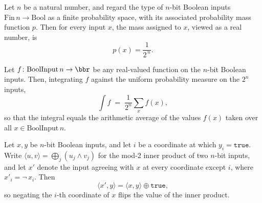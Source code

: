 \begin{lemma}
\label{CommunicationComplexity.Functions.InnerProduct.pmf_toReal_eq_two_pow_inv}
\leanok
{}
Let $n$ be a natural number, and regard the type of $n$-bit Boolean inputs
$\mathrm{Fin}\,n \to \mathrm{Bool}$ as a finite probability space, with its associated
probability mass function $p$. Then for every input $x$, the mass assigned to $x$,
viewed as a real number, is
\[
p(x) = \frac{1}{2^{\,n}}.
\]
\end{lemma}

\begin{lemma}
\label{CommunicationComplexity.Functions.InnerProduct.integral_eq_average_sum}
\leanok
{}
Let $f \colon \mathrm{BoolInput}\,n \to \bbr$ be any real-valued function on the $n$-bit
Boolean inputs. Then, integrating $f$ against the uniform probability measure on the
$2^n$ inputs,
\[
  \int f \;=\; \frac{1}{2^n} \sum_{x} f(x),
\]
so that the integral equals the arithmetic average of the values $f(x)$ taken over all
$x \in \mathrm{BoolInput}\,n$.
\end{lemma}

\begin{lemma}
\label{CommunicationComplexity.Functions.InnerProduct.innerProduct_flipAt_eq_xor}
\leanok
{}
Let $x, y$ be $n$-bit Boolean inputs, and let $i$ be a coordinate at which $y_i =
\mathtt{true}$. Write $\langle u, v\rangle = \bigoplus_{j} (u_j \wedge v_j)$ for the
mod-2 inner product of two $n$-bit inputs, and let $x'$ denote the input agreeing with
$x$ at every coordinate except $i$, where $x'_i = \lnot\, x_i$. Then \[ \langle x',
y\rangle = \langle x, y\rangle \oplus \mathtt{true}, \] so negating the $i$-th
coordinate of $x$ flips the value of the inner product.
\end{lemma}

